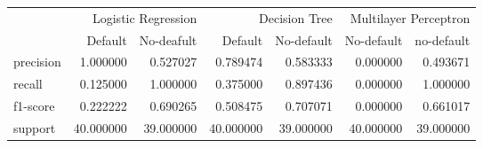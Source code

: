 \begin{table}
\thcenter
\begin{tabular}{lrrrrrr}
 & \multicolumn{2}{r}{Logistic Regression} & \multicolumn{2}{r}{Decision Tree  } & \multicolumn{2}{r}{Multilayer Perceptron} \\
 & Default & No-deafult & Default & No-default & No-default & no-default \\
precision & 1.000000 & 0.527027 & 0.789474 & 0.583333 & 0.000000 & 0.493671 \\
recall & 0.125000 & 1.000000 & 0.375000 & 0.897436 & 0.000000 & 1.000000 \\
f1-score & 0.222222 & 0.690265 & 0.508475 & 0.707071 & 0.000000 & 0.661017 \\
support & 40.000000 & 39.000000 & 40.000000 & 39.000000 & 40.000000 & 39.000000 \\
\end{tabular}
\end{table}
